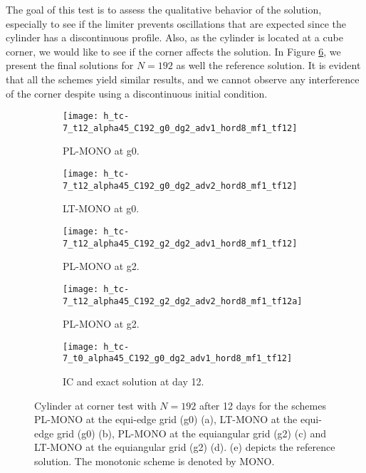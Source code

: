 The goal of this test is to assess the qualitative behavior of the solution, 
especially to see if the limiter prevents oscillations that are expected since the cylinder has a discontinuous profile.
Also, as the cylinder is located at a cube corner, we would like to see if the corner affects the solution.
In Figure \ref{chp-advcs-sec-exp-adv7}, we present the final solutions for $N=192$ as well the reference solution.
It is evident that all the schemes yield similar results, and we cannot observe any interference of the corner despite using a discontinuous initial condition.
\newpage
\begin{figure}[!htb]
	\centering
	\begin{subfigure}{0.3\textwidth}
		\centering
		\texttt{[image: h\_tc-7\_t12\_alpha45\_C192\_g0\_dg2\_adv1\_hord8\_mf1\_tf12]}
		\caption{PL-MONO at g0.\label{chp-advcs-sec-exp-adv7-b}}
	\end{subfigure}
	\begin{subfigure}{0.3\textwidth}
		\centering
		\texttt{[image: h\_tc-7\_t12\_alpha45\_C192\_g0\_dg2\_adv2\_hord8\_mf1\_tf12]}
		\caption{LT-MONO at g0.\label{chp-advcs-sec-exp-adv7-c}}
	\end{subfigure}
	
	\begin{subfigure}{0.3\textwidth}
		\centering
		\texttt{[image: h\_tc-7\_t12\_alpha45\_C192\_g2\_dg2\_adv1\_hord8\_mf1\_tf12]}
		\caption{PL-MONO at g2.\label{chp-advcs-sec-exp-adv7-d}}
	\end{subfigure}
	\begin{subfigure}{0.3\textwidth}
	\centering
	\texttt{[image: h\_tc-7\_t12\_alpha45\_C192\_g2\_dg2\_adv2\_hord8\_mf1\_tf12a]}
	\caption{PL-MONO at g2.\label{chp-advcs-sec-exp-adv7-e}}
    \end{subfigure}

	\begin{subfigure}{0.3\textwidth}
	\centering
	\texttt{[image: h\_tc-7\_t0\_alpha45\_C192\_g0\_dg2\_adv1\_hord8\_mf1\_tf12]}
	\caption{IC and exact solution at day 12.\label{chp-advcs-sec-exp-adv7-a}}
    \end{subfigure}
	\caption{Cylinder at corner test with $N=192$ after 12 days for the schemes 
	PL-MONO at the equi-edge grid (g0) (a),	LT-MONO at the equi-edge grid (g0) (b), 
	PL-MONO at the equiangular grid (g2) (c) and LT-MONO at the equiangular grid (g2) (d).
	(e) depicts the reference solution. The monotonic scheme is denoted by MONO.
	\label{chp-advcs-sec-exp-adv7}}
\end{figure}

